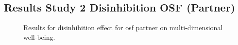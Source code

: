 \documentclass[
  singlecolumn]{article}
\begin{document}
\newpage{}

\subsection{Results Study 2 Disinhibition OSF
(Partner)}\label{results-study-2-disinhibition-osf-partner}

\begin{figure}


\caption{\label{fig-results-disinhibition-partner-osf}Results for
disinhibition effect for osf partner on multi-dimensional well-being.}

\end{figure}%

\newpage{}
\end{document}
